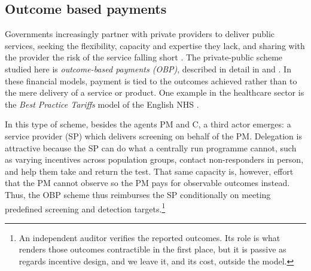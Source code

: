 \documentclass[12pt]{article}
\begin{document}
 
\subsection{Outcome based payments}\label{sec:OBP}
Governments increasingly partner with private providers to deliver public services, seeking the flexibility, capacity and expertise they lack, and sharing with the provider the risk of the service falling short \citep{roehrich2014public}. The private-public scheme studied here is \emph{outcome-based payments (OBP)}, described in detail in \cite{vlaanderen2019design} and \cite{fox2021evaluating}. In these financial models, payment is tied to the outcomes achieved rather than to the mere delivery of a service or product. One example in the healthcare sector is the {\em Best Practice Tariffs} model of the English NHS \citep{kristensen2016optimal}.

In this type of scheme, besides the agents PM and C, a third actor emerges: a service provider (SP) which delivers screening on behalf of the PM. Delegation is attractive because the SP can do what a centrally run programme cannot, such as varying incentives across population groups, contact non-responders in person, and help them take and return the test. That same capacity is, however, effort that the PM cannot observe so the PM pays for observable outcomes instead. Thus, the OBP scheme thus reimburses the SP conditionally on meeting predefined screening and detection targets.\footnote{An independent auditor verifies the reported outcomes. Its role is what renders those outcomes contractible in the first place, but it is passive as regards incentive design, and we leave it, and its cost, outside the model.}
\end{document}
